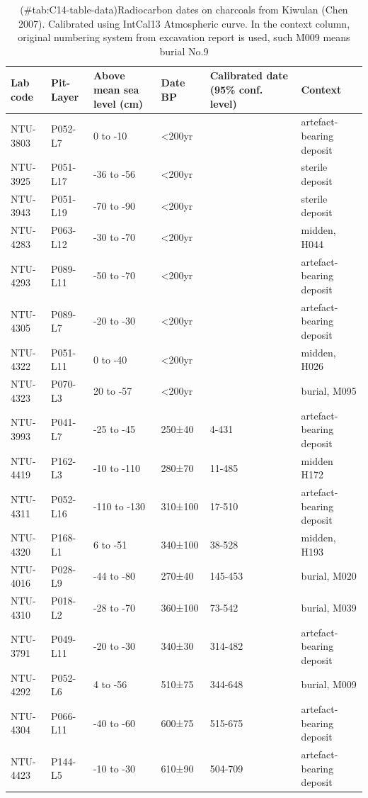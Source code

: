 \documentclass[]{article}
\begin{document}
\begin{table}

\caption{(\#tab:C14-table-data)Radiocarbon dates on charcoals from Kiwulan (Chen 2007). Calibrated using IntCal13 Atmospheric curve. In the context column, original numbering system from excavation report is used, such M009 means burial No.9 }
\centering
\begin{tabular}[t]{l|l|l|l|l|l}
\hline
Lab code & Pit-Layer & Above mean sea level (cm) & Date BP & Calibrated date (95\% conf. level) & Context\\
\hline
NTU-3803 & P052-L7 & 0 to -10 & <200yr &  & artefact-bearing deposit\\
\hline
NTU-3925 & P051-L17 & -36 to -56 & <200yr &  & sterile deposit\\
\hline
NTU-3943 & P051-L19 & -70 to -90 & <200yr &  & sterile deposit\\
\hline
NTU-4283 & P063-L12 & -30 to -70 & <200yr &  & midden, H044\\
\hline
NTU-4293 & P089-L11 & -50 to -70 & <200yr &  & artefact-bearing deposit\\
\hline
NTU-4305 & P089-L7 & -20 to -30 & <200yr &  & artefact-bearing deposit\\
\hline
NTU-4322 & P051-L11 & 0 to -40 & <200yr &  & midden, H026\\
\hline
NTU-4323 & P070-L3 & 20 to -57 & <200yr &  & burial, M095\\
\hline
NTU-3993 & P041-L7 & -25 to -45 & 250±40 & 4-431 & artefact-bearing deposit\\
\hline
NTU-4419 & P162-L3 & -10 to -110 & 280±70 & 11-485 & midden H172\\
\hline
NTU-4311 & P052-L16 & -110 to -130 & 310±100 & 17-510 & artefact-bearing deposit\\
\hline
NTU-4320 & P168-L1 & 6 to -51 & 340±100 & 38-528 & midden, H193\\
\hline
NTU-4016 & P028-L9 & -44 to -80 & 270±40 & 145-453 & burial, M020\\
\hline
NTU-4310 & P018-L2 & -28 to -70 & 360±100 & 73-542 & burial, M039\\
\hline
NTU-3791 & P049-L11 & -20 to -30 & 340±30 & 314-482 & artefact-bearing deposit\\
\hline
NTU-4292 & P052-L6 & 4 to -56 & 510±75 & 344-648 & burial, M009\\
\hline
NTU-4304 & P066-L11 & -40 to -60 & 600±75 & 515-675 & artefact-bearing deposit\\
\hline
NTU-4423 & P144-L5 & -10 to -30 & 610±90 & 504-709 & artefact-bearing deposit\\

\end{tabular}
\end{table}
\end{document}

